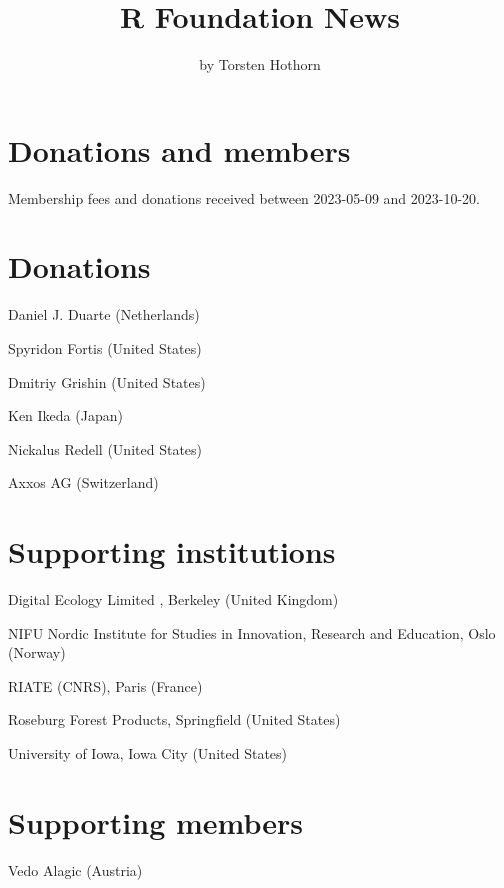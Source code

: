\title{R Foundation News}


\author{by Torsten Hothorn}

\maketitle


\hypertarget{donations-and-members}{%
\section{Donations and members}\label{donations-and-members}}

Membership fees and donations received between
2023-05-09 and 2023-10-20.

\hypertarget{donations}{%
\section{Donations}\label{donations}}

\indent \indent Daniel J. Duarte (Netherlands)

Spyridon Fortis (United States)

Dmitriy Grishin (United States)

Ken Ikeda (Japan)

Nickalus Redell (United States)

Axxos AG (Switzerland)

\hypertarget{supporting-institutions}{%
\section{Supporting institutions}\label{supporting-institutions}}

\indent \indent Digital Ecology Limited , Berkeley (United Kingdom)

NIFU Nordic Institute for Studies in Innovation, Research and Education, Oslo (Norway)

RIATE (CNRS), Paris (France)

Roseburg Forest Products, Springfield (United States)

University of Iowa, Iowa City (United States)

\hypertarget{supporting-members}{%
\section{Supporting members}\label{supporting-members}}

\indent \indent Vedo Alagic (Austria)

